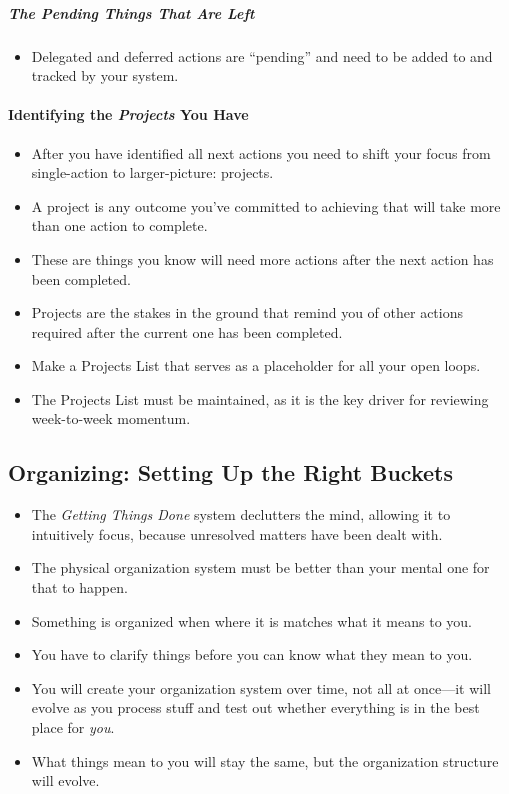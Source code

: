 \documentclass{article}
\begin{document}
\subparagraph{The Pending Things That Are Left}

\begin{itemize}
  \item Delegated and deferred actions are ``pending'' and need to be added to and tracked by your system.
\end{itemize}

\paragraph{Identifying the \textit{Projects} You Have}

\begin{itemize}
  \item After you have identified all next actions you need to shift your focus from single-action to larger-picture: projects.
  \item A project is any outcome you've committed to achieving that will take more than one action to complete.
  \item These are things you know will need more actions after the next action has been completed.
  \item Projects are the stakes in the ground that remind you of other actions required after the current one has been completed.
  \item Make a Projects List that serves as a placeholder for all your open loops.
  \item The Projects List must be maintained, as it is the key driver for reviewing week-to-week momentum.
\end{itemize}

\subsection{Organizing: Setting Up the Right Buckets}

\begin{itemize}
  \item The \textit{Getting Things Done} system declutters the mind, allowing it to intuitively focus, because unresolved matters have been dealt with.
  \item The physical organization system must be better than your mental one for that to happen.
  \item Something is organized when where it is matches what it means to you.
  \item You have to clarify things before you can know what they mean to you.
  \item You will create your organization system over time, not all at once---it will evolve as you process stuff and test out whether everything is in the best place for \emph{you}.
  \item What things mean to you will stay the same, but the organization structure will evolve.
\end{itemize}
\end{document}
